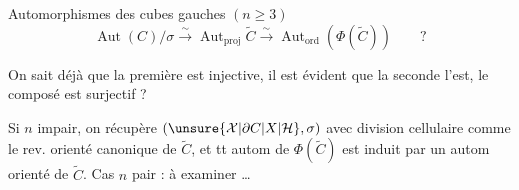 Automorphismes des cubes gauches $(n\geq3)$
\[
\operatorname{Aut}(C)/\sigma\xrightarrow{\sim}\operatorname{Aut}_{\mathrm{proj}}\widetilde C\xrightarrow{\sim}\operatorname{Aut}_{\mathrm{ord}}(\Phi(\widetilde C))\qquad ?
\]

On sait déjà que la première  est injective, il est évident que la seconde l'est, le composé  est  surjectif ?

Si $n$ impair, on récupère $(\unsure{\mathcal X|\partial C|X|\mathcal H},\sigma)$ avec division cellulaire comme le rev. orienté canonique de $\widetilde C$, et tt autom de $\Phi(\widetilde C)$ est induit par un autom orienté de $\widetilde C$. Cas $n$ pair : à examiner \ldots
